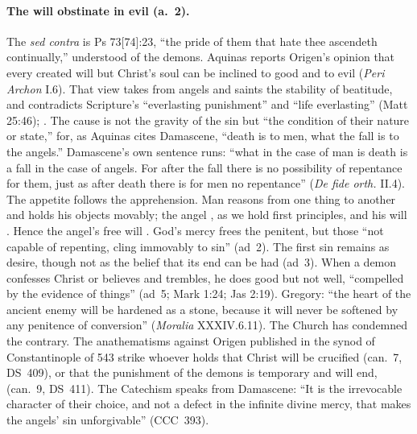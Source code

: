 \paragraph{The will obstinate in evil (a.~2).} The \emph{sed contra} is
Ps 73[74]:23, ``the pride of them that hate thee ascendeth continually,''
understood of the demons. Aquinas reports Origen's opinion that every
created will but Christ's soul can be inclined to good and to evil
(\emph{Peri Archon} I.6). That view takes from angels and saints the
stability of beatitude, and contradicts Scripture's ``everlasting
punishment'' and ``life everlasting'' (Matt 25:46); . The cause is not the
gravity of the sin but ``the condition of their nature or state,'' for,
as Aquinas cites Damascene, ``death is to men, what the fall is to the
angels.'' Damascene's own sentence runs: ``what in the case of man is
death is a fall in the case of angels. For after the fall there is no
possibility of repentance for them, just as after death there is for men
no repentance'' (\emph{De fide orth.} II.4). The appetite follows the
apprehension. Man
reasons from one thing to another and holds his objects movably; the
angel , as we hold first
principles, and his will . Hence the
angel's free will . God's mercy frees the penitent, but those
``not capable of repenting, cling immovably to sin'' (ad~2). The first
sin remains as desire, though not as the belief that its end can be
had (ad~3). When a demon confesses Christ or believes and trembles, he
does good but not well, ``compelled by the evidence of things''
(ad~5; Mark 1:24; Jas 2:19). Gregory: ``the heart of the ancient enemy
will be hardened as a stone, because it will never be softened by any
penitence of conversion'' (\emph{Moralia} XXXIV.6.11). The Church has
condemned the contrary. The anathematisms against Origen published in
the synod of Constantinople of 543 strike whoever holds that Christ will
be crucified
 (can.~7, DS~409), or
that the punishment of the demons is temporary and will end,  (can.~9, DS~411). The Catechism speaks from Damascene: ``It is
the irrevocable character of their choice, and not a defect in the
infinite divine mercy, that makes the angels' sin unforgivable''
(CCC~393).

